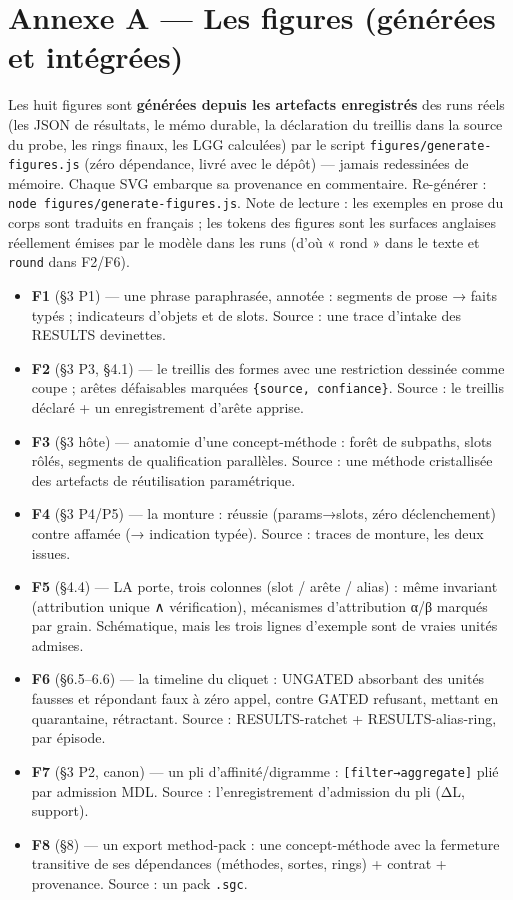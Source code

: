 \documentclass[11pt]{article}
\begin{document}
\section*{Annexe A — Les figures (générées et intégrées)}

Les huit figures sont \textbf{générées depuis les artefacts enregistrés} des runs réels (les JSON de résultats, le mémo durable, la déclaration du treillis dans la source du probe, les rings finaux, les LGG calculées) par le script \texttt{figures/\allowbreak{}generate-figures.js} (zéro dépendance, livré avec le dépôt) — jamais redessinées de mémoire. Chaque SVG embarque sa provenance en commentaire. Re-générer : \texttt{node figures/\allowbreak{}generate-figures.js}. Note de lecture : les exemples en prose du corps sont traduits en français ; les tokens des figures sont les surfaces anglaises réellement émises par le modèle dans les runs (d'où « rond » dans le texte et \texttt{round} dans F2/F6).

\begin{itemize}
\item \textbf{F1} (§3 P1) — une phrase paraphrasée, annotée : segments de prose → faits typés ; indicateurs d'objets et de slots. Source : une trace d'intake des RESULTS devinettes.
\item \textbf{F2} (§3 P3, §4.1) — le treillis des formes avec une restriction dessinée comme coupe ; arêtes défaisables marquées \texttt{\{source, confiance\}}. Source : le treillis déclaré + un enregistrement d'arête apprise.
\item \textbf{F3} (§3 hôte) — anatomie d'une concept-méthode : forêt de subpaths, slots rôlés, segments de qualification parallèles. Source : une méthode cristallisée des artefacts de réutilisation paramétrique.
\item \textbf{F4} (§3 P4/P5) — la monture : réussie (params→slots, zéro déclenchement) contre affamée (→ indication typée). Source : traces de monture, les deux issues.
\item \textbf{F5} (§4.4) — LA porte, trois colonnes (slot / arête / alias) : même invariant (attribution unique ∧ vérification), mécanismes d'attribution α/β marqués par grain. Schématique, mais les trois lignes d'exemple sont de vraies unités admises.
\item \textbf{F6} (§6.5–6.6) — la timeline du cliquet : UNGATED absorbant des unités fausses et répondant faux à zéro appel, contre GATED refusant, mettant en quarantaine, rétractant. Source : RESULTS-ratchet + RESULTS-alias-ring, par épisode.
\item \textbf{F7} (§3 P2, canon) — un pli d'affinité/digramme : \texttt{[filter→aggregate]} plié par admission MDL. Source : l'enregistrement d'admission du pli (ΔL, support).
\item \textbf{F8} (§8) — un export method-pack : une concept-méthode avec la fermeture transitive de ses dépendances (méthodes, sortes, rings) + contrat + provenance. Source : un pack \texttt{.sgc}.
\end{itemize}
\end{document}
